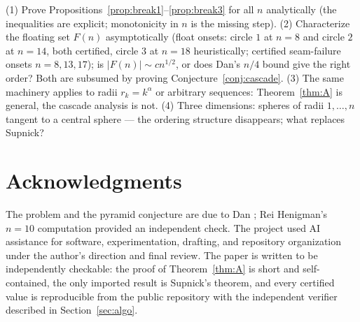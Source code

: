 \documentclass[11pt]{article}
\theoremstyle{definition}
\theoremstyle{remark}
\begin{document}
(1) Prove Propositions~\ref{prop:break1}--\ref{prop:break3} for all $n$ analytically (the inequalities are explicit; monotonicity in $n$ is the missing step). (2) Characterize the floating set $F(n)$ asymptotically (float onsets: circle $1$ at $n=8$ and circle $2$ at $n=14$, both certified, circle $3$ at $n=18$ heuristically; certified seam-failure onsets $n=8,13,17$); is $|F(n)|\sim cn^{1/2}$, or does Dan's $n/4$ bound give the right order? Both are subsumed by proving Conjecture~\ref{conj:cascade}. (3) The same machinery applies to radii $r_k=k^\alpha$ or arbitrary sequences: Theorem~\ref{thm:A} is general, the cascade analysis is not. (4) Three dimensions: spheres of radii $1,\dots,n$ tangent to a central sphere --- the ordering structure disappears; what replaces Supnick? 

\section*{Acknowledgments}
The problem and the pyramid conjecture are due to Dan \cite{mse}; Rei Henigman's $n=10$ computation provided an independent check. The project used AI assistance for software, experimentation, drafting, and repository organization under the author's direction and final review. The paper is written to be independently checkable: the proof of Theorem~\ref{thm:A} is short and self-contained, the only imported result is Supnick's theorem, and every certified value is reproducible from the public repository with the independent verifier described in Section~\ref{sec:algo}.
\end{document}
